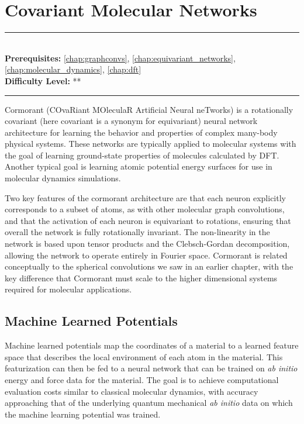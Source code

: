 \documentclass[book.tex]{subfiles}
\begin{document}
\chapter{Covariant Molecular Networks}

\label{chap:cormorant}
\noindent\rule{11cm}{0.4pt} \\
\textbf{Prerequisites:} \autoref{chap:graphconvs}, \autoref{chap:equivariant_networks}, \autoref{chap:molecular_dynamics},  \autoref{chap:dft} \\
\textbf{Difficulty Level:} ** \\
\noindent\rule{11cm}{0.4pt}
\vspace{5mm}

Cormorant\cite{anderson2019cormorant} (COvaRiant MOleculaR Artificial Neural neTworks) is a rotationally covariant (here covariant is a synonym for equivariant) neural network architecture for learning the behavior and properties of complex many-body physical systems. These networks are typically applied to molecular systems with the goal of learning ground-state properties of molecules calculated by DFT. Another typical goal is learning atomic potential energy surfaces for use in molecular dynamics simulations. 

Two key features of the cormorant architecture are that each neuron explicitly corresponds to a subset of atoms, as with other molecular graph convolutions, and that the activation of each neuron is equivariant to rotations, ensuring that overall the network is fully rotationally invariant. The non-linearity in the network is based upon tensor products and the Clebsch-Gordan decomposition, allowing the network to operate entirely in Fourier space. Cormorant is related conceptually to the spherical convolutions we saw in an earlier chapter, with the key difference that Cormorant must scale to the higher dimensional systems required for molecular applications.

\section{Machine Learned Potentials}

Machine learned potentials map the coordinates of a material to a learned feature space that describes the local environment of each atom in the material. This featurization can then be fed to a neural network that can be trained on \textit{ab initio} energy and force data for the material. The  goal is to achieve computational evaluation costs similar to classical molecular dynamics, with accuracy approaching that of the underlying quantum mechanical \textit{ab initio} data on which the machine learning potential was trained. 
\end{document}
